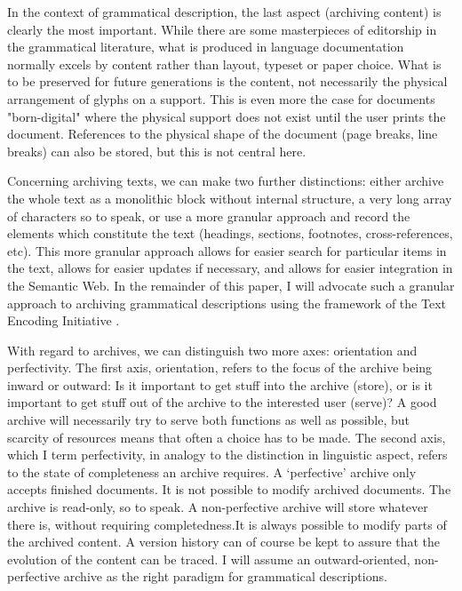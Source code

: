 \documentclass[a4paper,10pt]{article}
\begin{document}
In the context of grammatical description, the last aspect (archiving content) is clearly the most important. While there are some masterpieces of editorship in the grammatical literature, what is produced in language documentation normally excels by content rather than layout, typeset or paper choice. What is to be preserved for future generations is the content, not necessarily the physical arrangement of glyphs on a support. This is even more the case for documents "born-digital" where the physical support does not exist until the user prints the document. References to the  physical shape of the document (page breaks, line breaks) can also be stored, but this is not central here.

Concerning archiving texts, we can make two further distinctions: either archive the whole text as a monolithic block without internal structure, a very long array of characters so to speak, or use a more granular approach and record the elements which constitute the text (headings, sections, footnotes, cross-references, etc). This more granular approach allows for easier search for particular items in the text, allows for easier updates if necessary, and allows for easier  integration in the Semantic Web. In the remainder of this paper, I will advocate such a granular approach to archiving grammatical descriptions using the framework of the Text Encoding Initiative \citep[TEI,][]{TEIGuidelines}.

With regard to archives, we can distinguish two more axes: orientation and perfectivity. The first axis, orientation, refers to the focus of the archive being inward or outward: Is it important to get stuff into the archive (store), or is it important to get stuff out of the archive to the interested user (serve)? A good archive will necessarily try to serve both functions as well as possible, but scarcity of resources means that often a choice has to be made. The second axis, which I term perfectivity, in analogy to the distinction in linguistic aspect, refers to the state of completeness an archive requires. A `perfective' archive only accepts finished documents. It is not possible to modify archived documents. The archive is read-only, so to speak.  A non-perfective archive will store whatever there is, without requiring completedness.It is always possible to modify parts of the archived content. A version history can of course be kept to assure that the evolution of the content can be traced. I will assume an outward-oriented, non-perfective archive as the right paradigm for grammatical descriptions.
\end{document}
